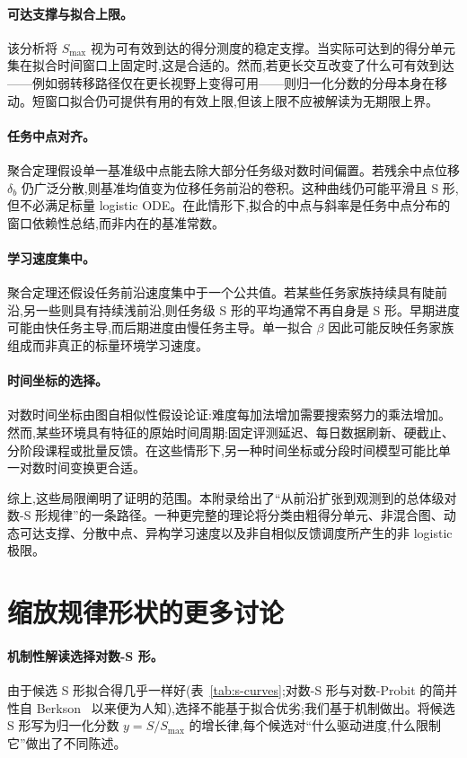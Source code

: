 \paragraph{可达支撑与拟合上限。} 该分析将 $S_{\max}$ 视为可有效到达的得分测度的稳定支撑。当实际可达到的得分单元集在拟合时间窗口上固定时,这是合适的。然而,若更长交互改变了什么可有效到达——例如弱转移路径仅在更长视野上变得可用——则归一化分数的分母本身在移动。短窗口拟合仍可提供有用的有效上限,但该上限不应被解读为无期限上界。

\paragraph{任务中点对齐。} 聚合定理假设单一基准级中点能去除大部分任务级对数时间偏置。若残余中点位移 $\delta_{b}$ 仍广泛分散,则基准均值变为位移任务前沿的卷积。这种曲线仍可能平滑且 S 形,但不必满足标量 logistic ODE。在此情形下,拟合的中点与斜率是任务中点分布的窗口依赖性总结,而非内在的基准常数。

\paragraph{学习速度集中。} 聚合定理还假设任务前沿速度集中于一个公共值。若某些任务家族持续具有陡前沿,另一些则具有持续浅前沿,则任务级 S 形的平均通常不再自身是 S 形。早期进度可能由快任务主导,而后期进度由慢任务主导。单一拟合 $\beta$ 因此可能反映任务家族组成而非真正的标量环境学习速度。

\paragraph{时间坐标的选择。} 对数时间坐标由图自相似性假设论证:难度每加法增加需要搜索努力的乘法增加。然而,某些环境具有特征的原始时间周期:固定评测延迟、每日数据刷新、硬截止、分阶段课程或批量反馈。在这些情形下,另一种时间坐标或分段时间模型可能比单一对数时间变换更合适。

综上,这些局限阐明了证明的范围。本附录给出了``从前沿扩张到观测到的总体级对数-S 形规律''的一条路径。一种更完整的理论将分类由粗得分单元、非混合图、动态可达支撑、分散中点、异构学习速度以及非自相似反馈调度所产生的非 logistic 极限。

\section{缩放规律形状的更多讨论}
\label{app:shapes}

\paragraph{机制性解读选择对数-S 形。} 由于候选 S 形拟合得几乎一样好(表~\ref{tab:s-curves};对数-S 形与对数-Probit 的简并性自 Berkson~\cite{berkson1944} 以来便为人知),选择不能基于拟合优劣;我们基于机制做出。将候选 S 形写为归一化分数 $y = S / S_{\max}$ 的增长律,每个候选对``什么驱动进度,什么限制它''做出了不同陈述。

